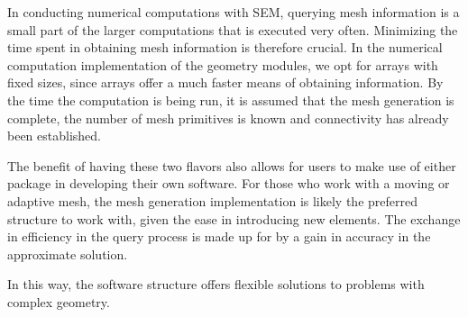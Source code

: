 \documentclass[12pt]{softwaremanual}
\begin{document}
In conducting numerical computations with SEM, querying mesh information is a small part of the larger computations that is executed very often. Minimizing the time spent in obtaining mesh information is therefore crucial. In the numerical computation implementation of the geometry modules, we opt for arrays with fixed sizes, since arrays offer a much faster means of obtaining information. By the time the computation is being run, it is assumed that the mesh generation is complete, the number of mesh primitives is known and connectivity has already been established. 

The benefit of having these two flavors also allows for users to make use of either package in developing their own software. For those who work with a moving or adaptive mesh, the mesh generation implementation is likely the preferred structure to work with, given the ease in introducing new elements. The exchange in efficiency in the query process is made up for by a gain in accuracy in the approximate solution. 

In this way, the software structure offers flexible solutions to problems with complex geometry. 
\end{document}
